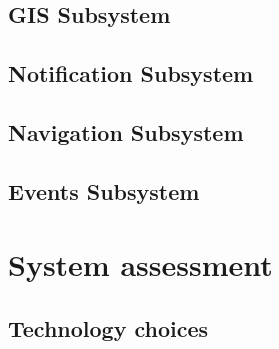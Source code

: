 \documentclass{article}
\begin{document}
		\subsection{GIS Subsystem}

		\subsection{Notification Subsystem}
	
		\subsection{Navigation Subsystem}
	
		\subsection{Events Subsystem}
	
	\pagebreak
	
	\section{System assessment}	
	
		\subsection{Technology choices}
\end{document}
